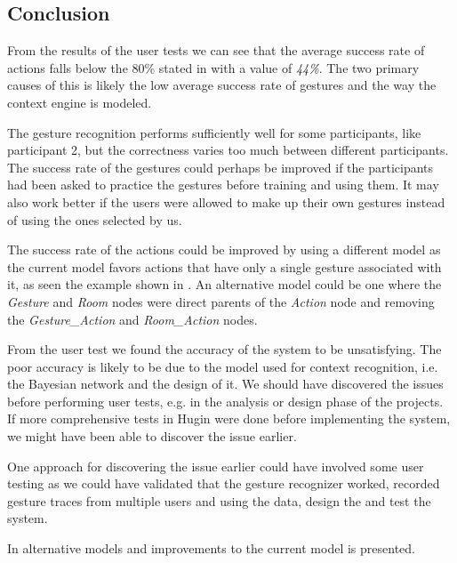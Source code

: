 \subsection{Conclusion}
\label{sec:evaluation:user-tests-conclusion}

From the results of the user tests we can see that the average success rate of actions falls below the 80\% stated in  with a value of \emph{44\%}.
The two primary causes of this is likely the low average success rate of gestures and the way the context engine is modeled.

The gesture recognition performs sufficiently well for some participants, like participant 2, but the correctness varies too much between different participants.
The success rate of the gestures could perhaps be improved if the participants had been asked to practice the gestures before training and using them.
It may also work better if the users were allowed to make up their own gestures instead of using the ones selected by us.

The success rate of the actions could be improved by using a different model as the current model favors actions that have only a single gesture associated with it, as seen the example shown in .
An alternative model could be one where the \emph{Gesture} and \emph{Room} nodes were direct parents of the \emph{Action} node and removing the \emph{Gesture\_Action} and \emph{Room\_Action} nodes.

From the user test we found the accuracy of the system to be unsatisfying. The poor accuracy is likely to be due to the model used for context recognition, i.e. the Bayesian network and the design of it. We should have discovered the issues before performing user tests, e.g. in the analysis or design phase of the projects. If more comprehensive tests in Hugin were done before implementing the system, we might have been able to discover the issue earlier.

One approach for discovering the issue earlier could have involved some user testing as we could have validated that the gesture recognizer worked, recorded gesture traces from multiple users and using the data, design the and test the system.

In  alternative models and improvements to the current model is presented.

